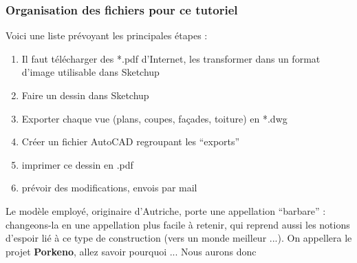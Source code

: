 \documentclass[a4paper,12pt,french]{sphinxmanual}
\begin{document}
\subsubsection{Organisation des fichiers pour ce tutoriel}
\label{init_su+acad/002_demarrage:organisation-des-fichiers-pour-ce-tutoriel}
Voici une liste prévoyant les principales étapes :
\begin{enumerate}
\item {} 
Il faut télécharger des *.pdf d'Internet, les transformer dans un format d'image utilisable dans Sketchup

\item {} 
Faire un dessin dans Sketchup

\item {} 
Exporter chaque vue (plans, coupes, façades, toiture) en *.dwg

\item {} 
Créer un fichier AutoCAD regroupant les ``exports''

\item {} 
imprimer ce dessin en .pdf

\item {} 
prévoir des modifications, envois par mail

\end{enumerate}

Le modèle employé, originaire d'Autriche, porte une appellation ``barbare'' :
changeons-la en une appellation plus facile à retenir, qui reprend aussi les
notions d'espoir lié à ce type de construction (vers un monde meilleur ...). On
appellera le projet \textbf{Porkeno}, allez savoir pourquoi ...
\label{init_su+acad/002_demarrage:arborescence-projet}
Nous aurons donc
\end{document}
